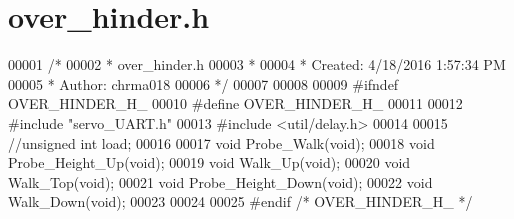 \hypertarget{over__hinder_8h_source}{}\section{over\+\_\+hinder.\+h}
\label{over__hinder_8h_source}

\begin{DoxyCode}
00001 \textcolor{comment}{/*}
00002 \textcolor{comment}{ * over\_hinder.h}
00003 \textcolor{comment}{ *}
00004 \textcolor{comment}{ * Created: 4/18/2016 1:57:34 PM}
00005 \textcolor{comment}{ *  Author: chrma018}
00006 \textcolor{comment}{ */} 
00007 
00008 
00009 \textcolor{preprocessor}{#ifndef OVER\_HINDER\_H\_}
00010 \textcolor{preprocessor}{#define OVER\_HINDER\_H\_}
00011 
00012 \textcolor{preprocessor}{#include "servo\_UART.h"}
00013 \textcolor{preprocessor}{#include <util/delay.h>}
00014 
00015 \textcolor{comment}{//unsigned int load;}
00016 
00017 \textcolor{keywordtype}{void} Probe\_Walk(\textcolor{keywordtype}{void});
00018 \textcolor{keywordtype}{void} Probe\_Height\_Up(\textcolor{keywordtype}{void}); 
00019 \textcolor{keywordtype}{void} Walk\_Up(\textcolor{keywordtype}{void}); 
00020 \textcolor{keywordtype}{void} Walk\_Top(\textcolor{keywordtype}{void});
00021 \textcolor{keywordtype}{void} Probe\_Height\_Down(\textcolor{keywordtype}{void}); 
00022 \textcolor{keywordtype}{void} Walk\_Down(\textcolor{keywordtype}{void}); 
00023 
00024 
00025 \textcolor{preprocessor}{#endif }\textcolor{comment}{/* OVER\_HINDER\_H\_ */}\textcolor{preprocessor}{}
\end{DoxyCode}
